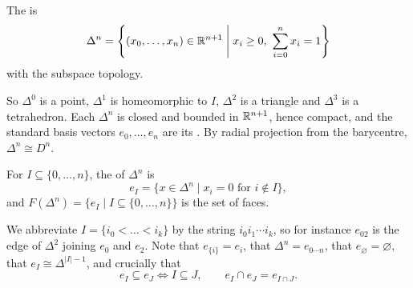 \documentclass[a4paper]{scrartcl}
\begin{document}
\begin{definition}[Simplex]
	The  is
	$$
	\Delta^n = \left\{(x_0,\dots,x_n) \in \mathbb{R}^{n+1} \;\middle|\; x_i \geq 0, \ \sum_{i=0}^n x_i = 1\right\}
	$$
	with the subspace topology.
\end{definition}

So $\Delta^0$ is a point, $\Delta^1$ is homeomorphic to $I$, $\Delta^2$ is a triangle and
$\Delta^3$ is a tetrahedron. Each $\Delta^n$ is closed and bounded in $\mathbb{R}^{n+1}$, hence
compact, and the standard basis vectors $e_0,\dots,e_n$ are its . By
radial projection from the barycentre, $\Delta^n \cong D^n$.

\begin{center}
\end{center}

\begin{definition}[Face]
	For $I \subseteq \{0,\dots,n\}$, the  of $\Delta^n$ is
	$$
	e_I = \{x \in \Delta^n \mid x_i = 0 \text{ for } i \notin I\},
	$$
	and $F(\Delta^n) = \{e_I \mid I \subseteq \{0,\dots,n\}\}$ is the set of faces.
\end{definition}

We abbreviate $I = \{i_0 < \dots < i_k\}$ by the string $i_0i_1\cdots i_k$, so for instance
$e_{02}$ is the edge of $\Delta^2$ joining $e_0$ and $e_2$. Note that
$e_{\{i\}} = e_i$, that $\Delta^n = e_{0\cdots n}$, that $e_\varnothing = \varnothing$,
that $e_I \cong \Delta^{|I|-1}$, and crucially that
$$
e_I \subseteq e_J \iff I \subseteq J, \qquad e_I \cap e_J = e_{I \cap J}.
$$
\end{document}
